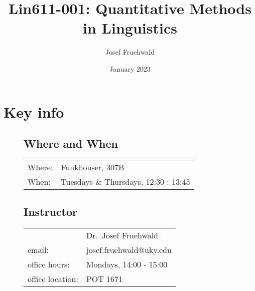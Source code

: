 \documentclass[
  letterpaper,
  DIV=11,
  numbers=noendperiod]{scrartcl}
\title{Lin611-001: Quantitative Methods in Linguistics}
\author{Josef Fruehwald}
\date{January 2023}
\renewcommand*\contentsname{Table of contents}
\newcommand\contentsname{Table of contents}
\begin{document}
\maketitle
\ifdefined\Shaded\renewenvironment{Shaded}{\begin{tcolorbox}[borderline west={3pt}{0pt}{shadecolor}, enhanced, breakable, interior hidden, boxrule=0pt, frame hidden, sharp corners]}{\end{tcolorbox}}\fi

\renewcommand*\contentsname{Sections}
{
\hypersetup{linkcolor=}
\setcounter{tocdepth}{1}
\tableofcontents
}
\hypertarget{key-info}{%
\section{Key info}\label{key-info}}

\begin{figure}

\begin{minipage}[t]{0.50\linewidth}

{\centering 

\hypertarget{where-and-when}{%
\subsection{Where and When}\label{where-and-when}}

\begin{longtable}[]{@{}ll@{}}
\toprule()
\endhead
Where: & Funkhouser, 307B \\
When: & Tuesdays \& Thursdays, 12:30 : 13:45 \\
\bottomrule()
\end{longtable}

}

\end{minipage}%
%
\begin{minipage}[t]{0.50\linewidth}

{\centering 

\hypertarget{instructor}{%
\subsection{Instructor}\label{instructor}}

\begin{longtable}[]{@{}ll@{}}
\toprule()
\endhead
& Dr.~Josef Fruehwald \\
email: & josef.fruehwald@uky.edu \\
office hours: & Mondays, 14:00 - 15:00 \\
office location: & POT 1671 \\
\bottomrule()
\end{longtable}

}

\end{minipage}%

\end{figure}
\end{document}
